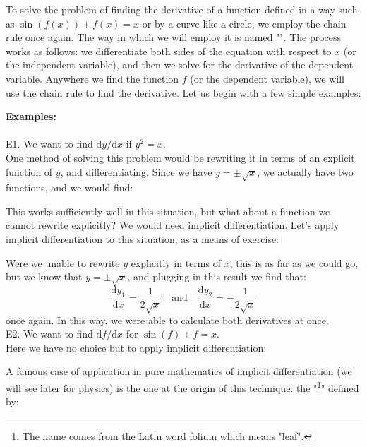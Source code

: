 	To solve the problem of finding the derivative of a function defined in a way such as $\sin(f(x)) + f(x) = x$ or by a curve like a circle, we employ the chain rule once again. The way in which we will employ it is named "". The process works as follows: we differentiate both sides of the equation with respect to $x$ (or the independent variable), and then we solve for the derivative of the dependent variable. Anywhere we find the function $f$ (or the dependent variable), we will use the chain rule to find the derivative. Let us begin with a few simple examples:
	\begin{tcolorbox}[colframe=black,colback=white,sharp corners]
	\textbf{{\Large {}}Examples:}\\\\
	E1. We want to find $\mathrm{d}y/\mathrm{d}x$ if $y^2 = x$.\\
	
	One method of solving this problem would be rewriting it in terms of an explicit function of $y$, and differentiating. Since we have $y = \pm \sqrt{x}$, we actually have two functions, and we would find:
	
	This works sufficiently well in this situation, but what about a function we cannot rewrite explicitly? We would need implicit differentiation. Let's apply implicit differentiation to this situation, as a means of exercise:
	
	Were we unable to rewrite $y$ explicitly in terms of $x$, this is as far as we could go, but we know that $y = \pm \sqrt{x}$, and plugging in this result we find that:
	$$\frac{\mathrm{d}y_1}{\mathrm{d}x} = \frac{1}{2\sqrt{x}} \quad \text{and} \quad \frac{\mathrm{d}y_2}{\mathrm{d}x} = -\frac{1}{2\sqrt{x}}$$
	once again. In this way, we were able to calculate both derivatives at once.\\
	
	E2. We want to find $\mathrm{d}f/\mathrm{d}x$ for $\sin(f) + f = x$.\\
	
	Here we have no choice but to apply implicit differentiation:
	
	\end{tcolorbox}
	A famous case of application in pure mathematics of implicit differentiation (we will see later for physics) is the one at the origin of this technique: the "\footnote{The name comes from the Latin word folium which means "leaf".}" defined by:
	
